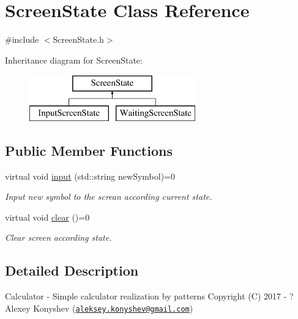 \hypertarget{class_screen_state}{}\section{Screen\+State Class Reference}
\label{class_screen_state}


{\ttfamily \#include $<$Screen\+State.\+h$>$}

Inheritance diagram for Screen\+State\+:\begin{figure}[H]
\begin{center}
\leavevmode
\includegraphics[height=2.000000cm]{class_screen_state}
\end{center}
\end{figure}
\subsection*{Public Member Functions}
\begin{DoxyCompactItemize}
\item 
virtual void \hyperlink{class_screen_state_adb71081141ec6c066d54f1dc77c78717}{input} (std\+::string new\+Symbol)=0
\begin{DoxyCompactList}\small\item\em Input new symbol to the screan according current state. \end{DoxyCompactList}\item 
\hypertarget{class_screen_state_a7ed07cbc56ad6b472263a6035335ad95}{}virtual void \hyperlink{class_screen_state_a7ed07cbc56ad6b472263a6035335ad95}{clear} ()=0\label{class_screen_state_a7ed07cbc56ad6b472263a6035335ad95}

\begin{DoxyCompactList}\small\item\em Clear screen according state. \end{DoxyCompactList}\end{DoxyCompactItemize}


\subsection{Detailed Description}
Calculator -\/ Simple calculator realization by patterns Copyright (C) 2017 -\/ ? Alexey Konyshev (\href{mailto:aleksey.konyshev@gmail.com}{\tt aleksey.\+konyshev@gmail.\+com})

